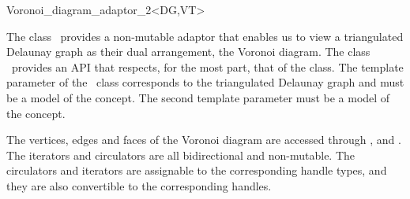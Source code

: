 

\begin{ccRefClass}{Voronoi_diagram_adaptor_2<DG,VT>}


\ccDefinition

The class \ccRefName\ provides a non-mutable adaptor that enables us
to view a triangulated Delaunay graph as their dual arrangement, the
Voronoi diagram. The class \ccRefName\ provides an API that respects,
for the most part, that of the
 class.
The template parameter of the \ccRefName\ class corresponds to the
triangulated Delaunay graph and must be a model of the
 concept. The second template parameter must be a
model of the  concept.




\ccTypes

\ccThreeToTwo
{}
%
\ccGlue
{}
\ccGlue
{}
\ccGlue
{}
{}
%
%

The vertices, edges and faces of the Voronoi diagram are accessed
through ,  and . 
The iterators and circulators are all bidirectional and non-mutable.
The circulators and iterators are assignable to the 
corresponding handle types, and they are also convertible to the
corresponding handles.


\end{ccRefClass}
